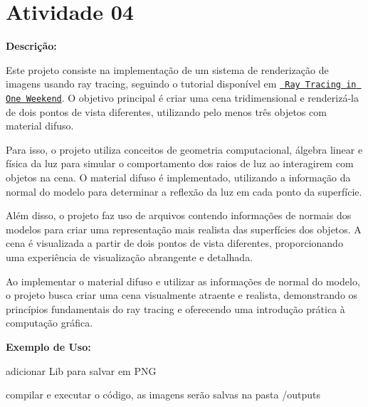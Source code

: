\chapter{Atividade 04}
\hypertarget{index}{}\label{index}
\label{index_md__2_users_2renanoliveira_2_desktop_2ufscar_22023-02_2computacao-grafica_2atividades-projeto_2_atividade05_2_r_e_a_d_m_e}%
%
 {\bfseries{Descrição\+:}}

Este projeto consiste na implementação de um sistema de renderização de imagens usando ray tracing, seguindo o tutorial disponível em \href{https://raytracing.github.io/books/RayTracingInOneWeekend.html}{\texttt{ Ray Tracing in One Weekend}}. O objetivo principal é criar uma cena tridimensional e renderizá-\/la de dois pontos de vista diferentes, utilizando pelo menos três objetos com material difuso.

Para isso, o projeto utiliza conceitos de geometria computacional, álgebra linear e física da luz para simular o comportamento dos raios de luz ao interagirem com objetos na cena. O material difuso é implementado, utilizando a informação da normal do modelo para determinar a reflexão da luz em cada ponto da superfície.

Além disso, o projeto faz uso de arquivos contendo informações de normais dos modelos para criar uma representação mais realista das superfícies dos objetos. A cena é visualizada a partir de dois pontos de vista diferentes, proporcionando uma experiência de visualização abrangente e detalhada.

Ao implementar o material difuso e utilizar as informações de normal do modelo, o projeto busca criar uma cena visualmente atraente e realista, demonstrando os princípios fundamentais do ray tracing e oferecendo uma introdução prática à computação gráfica.

{\bfseries{Exemplo de Uso\+:}}


\begin{DoxyItemize}
\item adicionar Lib para salvar em PNG 
\begin{DoxyCode}{0}

\end{DoxyCode}

\item compilar e executar o código, as imagens serão salvas na pasta {\ttfamily /outputs} 
\begin{DoxyCode}{0}

\end{DoxyCode}
 
\end{DoxyItemize}